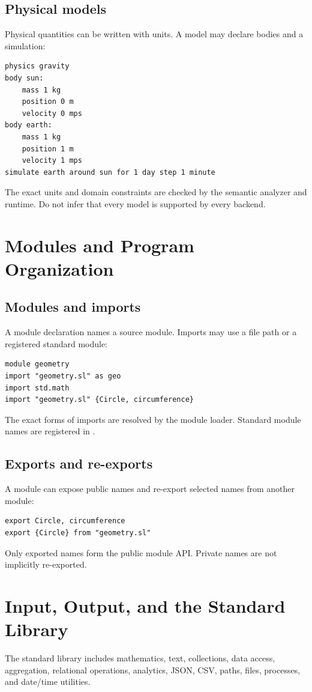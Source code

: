 \documentclass[11pt,a4paper,oneside]{book}
\newcommand{\code}[1]{\texttt{\detokenize{#1}}}
\begin{document}
\section{Physical models}
Physical quantities can be written with units. A model may declare bodies and a simulation:
\begin{lstlisting}
physics gravity
body sun:
    mass 1 kg
    position 0 m
    velocity 0 mps
body earth:
    mass 1 kg
    position 1 m
    velocity 1 mps
simulate earth around sun for 1 day step 1 minute
\end{lstlisting}
The exact units and domain constraints are checked by the semantic analyzer and runtime. Do not infer that every model is supported by every backend.

\chapter{Modules and Program Organization}
\section{Modules and imports}
A module declaration names a source module. Imports may use a file path or a registered standard module:
\begin{lstlisting}[language={}]
module geometry
import "geometry.sl" as geo
import std.math
import "geometry.sl" {Circle, circumference}
\end{lstlisting}
The exact forms of imports are resolved by the module loader. Standard module names are registered in \code{slang/stdlib/modules.py}.

\section{Exports and re-exports}
A module can expose public names and re-export selected names from another module:
\begin{lstlisting}[language={}]
export Circle, circumference
export {Circle} from "geometry.sl"
\end{lstlisting}
Only exported names form the public module API. Private names are not implicitly re-exported.

\chapter{Input, Output, and the Standard Library}
The standard library includes mathematics, text, collections, data access, aggregation, relational operations, analytics, JSON, CSV, paths, files, processes, and date/time utilities.
\end{document}
